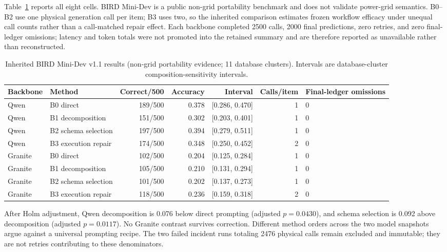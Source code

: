 \documentclass[applsci,article,submit,moreauthors]{Definitions/mdpi}
\begin{document}
Table~\ref{tab:bird} reports all eight cells. BIRD Mini-Dev is a public non-grid portability benchmark and does not validate power-grid semantics. B0--B2 use one physical generation call per item; B3 uses two, so the inherited comparison estimates frozen workflow efficacy under unequal call counts rather than a call-matched repair effect. Each backbone completed 2500 calls, 2000 final predictions, zero retries, and zero final-ledger omissions; latency and token totals were not promoted into the retained summary and are therefore reported as unavailable rather than reconstructed.

\begin{table}[htbp]
\caption{Inherited BIRD Mini-Dev v1.1 results (non-grid portability evidence; 11 database clusters). Intervals are database-cluster composition-sensitivity intervals.}
\label{tab:bird}
\centering
\small
\setlength{\tabcolsep}{3pt}
\begin{tabular}{llrrrrp{1.5cm}}
\toprule
Backbone & Method & Correct/500 & Accuracy & Interval & Calls/item & Final-ledger omissions\\
\midrule
Qwen & B0 direct & 189/500 & 0.378 & [0.286, 0.470] & 1 & 0\\
Qwen & B1 decomposition & 151/500 & 0.302 & [0.203, 0.401] & 1 & 0\\
Qwen & B2 schema selection & 197/500 & 0.394 & [0.279, 0.511] & 1 & 0\\
\cmidrule(lr){1-7}
Qwen & B3 execution repair & 174/500 & 0.348 & [0.250, 0.452] & 2 & 0\\
Granite & B0 direct & 102/500 & 0.204 & [0.125, 0.284] & 1 & 0\\
Granite & B1 decomposition & 105/500 & 0.210 & [0.131, 0.294] & 1 & 0\\
Granite & B2 schema selection & 101/500 & 0.202 & [0.137, 0.273] & 1 & 0\\
\cmidrule(lr){1-7}
Granite & B3 execution repair & 118/500 & 0.236 & [0.159, 0.318] & 2 & 0\\
\bottomrule
\end{tabular}
\end{table}

After Holm adjustment, Qwen decomposition is 0.076 below direct prompting (adjusted $p=0.0430$), and schema selection is 0.092 above decomposition (adjusted $p=0.0117$). No Granite contrast survives correction. Different method orders across the two model snapshots argue against a universal prompting recipe. The two failed incident runs totaling 2476 physical calls remain excluded and immutable; they are not retries contributing to these denominators.
\end{document}
